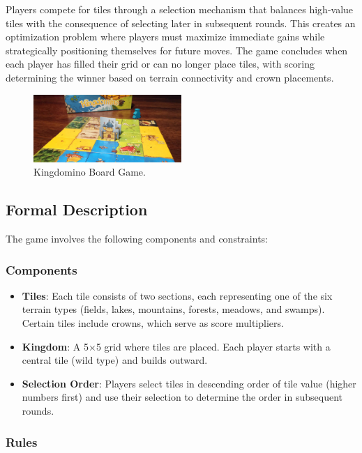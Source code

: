 \documentclass[conference]{IEEEtran}
\begin{document}
Players compete for tiles through a selection mechanism that balances
high-value tiles with the consequence of selecting later in subsequent rounds.
This creates an optimization problem where players must maximize immediate
gains while strategically positioning themselves for future moves. The game
concludes when each player has filled their grid or can no longer place tiles,
with scoring determining the winner based on terrain connectivity and crown
placements.

\begin{figure}[htbp]
    \centerline{\includegraphics[width=0.5\textwidth]{assets/kingdomino.jpg}}
    \caption{Kingdomino Board Game.}\label{fig:kingdomino}
\end{figure}

\subsection{Formal Description}

The game involves the following components and constraints:

\subsubsection{Components}

\begin{itemize}
    \item \textbf{Tiles}: Each tile consists of two sections, each representing one of the six terrain types (fields, lakes, mountains, forests, meadows, and swamps). Certain tiles include crowns, which serve as score multipliers.
    \item \textbf{Kingdom}: A 5$\times$5 grid where tiles are placed. Each player starts with a central tile (wild type) and builds outward.
    \item \textbf{Selection Order}: Players select tiles in descending order of tile value (higher numbers first) and use their selection to determine the order in subsequent rounds.
\end{itemize}

\subsubsection{Rules}
\end{document}
